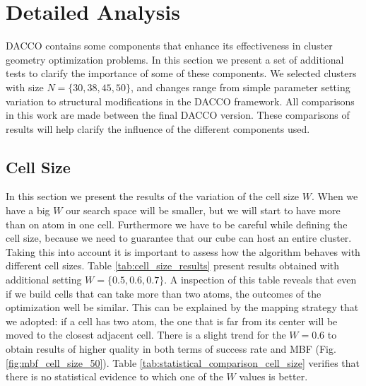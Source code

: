		\section{Detailed Analysis}
		\label{sec:detailed_analysis}
		
		DACCO contains some components that enhance its effectiveness in cluster geometry optimization problems. In this section we present a set of additional tests to clarify the importance of some of these components. We selected clusters with size $N=\{30, 38, 45, 50\}$, and changes range from simple parameter setting variation to structural modifications in the DACCO framework. All comparisons in this work are made between the final DACCO version. These comparisons of results will help clarify the influence of the different components used.
		
		
		\subsection{Cell Size}
		In this section we present the results of the variation of the cell size $W$. When we have a big $W$ our search space will be smaller, but we will start to have more than on atom in one cell. Furthermore we have to be careful while defining the cell size, because we need to guarantee that our cube can host an entire cluster. Taking this into account it is important to assess how the algorithm behaves with different cell sizes.
		Table \ref{tab:cell_size_results} present results obtained with additional setting $W=\{0.5, 0.6, 0.7\}$. A inspection of this table reveals that even if we build cells that can take more than two atoms, the outcomes of the optimization well be similar. This can be explained by the mapping strategy that we adopted: if a cell has two atom, the one that is far from its center will be moved to the closest adjacent cell.
		There is a slight trend for the $W=0.6$ to obtain results of higher quality in both terms of success rate and MBF (Fig. \ref{fig:mbf_cell_size_50}).
		Table \ref{tab:statistical_comparison_cell_size} verifies that there is no statistical evidence to which one of the $W$ values is better.
		   		
